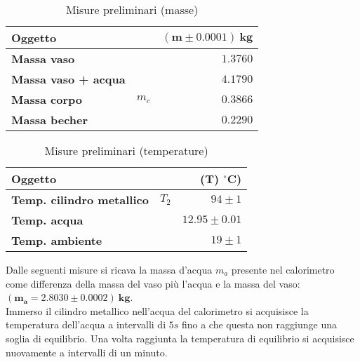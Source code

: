 \documentclass{article}
\begin{document}
	\begin{minipage}{0.4\textwidth}
		\begin{table}[H] \centering
			\begin{small}
				\begin{tabular}{@{}lrr@{}}\toprule
					\textbf{Oggetto}& &  \(\boldsymbol{(m \pm 0.0001) \SI{}{\kilogram}}\) \\ \midrule
					\textbf{Massa vaso}	&	 & \(1.3760\)   \\  \hdashline
					\textbf{Massa vaso + acqua}	&	 & \(4.1790\)   \\  \hdashline
					\textbf{Massa corpo}	& \(m_{c}\)	 & \(0.3866\)   \\  \hdashline
					\textbf{Massa becher}	&	 & \(0.2290\)   \\
					\bottomrule
				\end{tabular}
			\end{small}
			\caption{Misure preliminari (masse)}
		\end{table}
	\end{minipage}
	\begin{minipage}{0.6\textwidth}
		\begin{table}[H] \centering
			\begin{small}
				\begin{tabular}{@{}lrr@{}}\toprule
					\textbf{Oggetto}					&  			& \textbf{(\(\boldsymbol{T}\))} \(\boldsymbol{^\circ C}\))\\ \midrule
					\textbf{Temp. cilindro metallico}	& 	\(T_{2}\)		& \(94 \pm 1\)	 \\  \hdashline
					\textbf{Temp. acqua}				&					&\(12.95 \pm 0.01\)		 	 \\  \hdashline
					\textbf{Temp. ambiente}				&					& \(19 \pm 1\)		 	  \\  
					\bottomrule
				\end{tabular}
			\end{small}
			\caption{Misure preliminari (temperature)}
		\end{table}
	\end{minipage}
	\vspace{1cm}
	
	Dalle seguenti misure si ricava la massa d'acqua \(m_{a}\) presente nel calorimetro come differenza della massa del vaso più l'acqua e la massa del vaso: \(\boldsymbol{(m_{a} = 2.8030\pm 0.0002)\SI{}{\kilogram}}\). \\
	
	\noindent
	Immerso il cilindro metallico nell'acqua del calorimetro si acquisisce la temperatura dell'acqua a intervalli di \(5 s\) fino a che questa non raggiunge una soglia di equilibrio. Una volta raggiunta la temperatura di equilibrio si acquisisce nuovamente a intervalli di un minuto.
	
\end{document}
